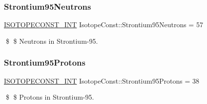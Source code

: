 \subsubsection{\texorpdfstring{Strontium95\+Neutrons}{Strontium95Neutrons}}
{\footnotesize\ttfamily \mbox{\hyperlink{group___isotope_const-_macros_ga5f18360b3e99483a35c32d789e62621c}{I\+S\+O\+T\+O\+P\+E\+C\+O\+N\+S\+T\+\_\+\+I\+NT}} Isotope\+Const\+::\+Strontium95\+Neutrons = 57}

\$ \$ Neutrons in Strontium-\/95. \mbox{\label{group___isotope_const-_strontium-_sr95_ga322a5c15ffe065a1cc477b8da9c54b05}} 
\subsubsection{\texorpdfstring{Strontium95\+Protons}{Strontium95Protons}}
{\footnotesize\ttfamily \mbox{\hyperlink{group___isotope_const-_macros_ga5f18360b3e99483a35c32d789e62621c}{I\+S\+O\+T\+O\+P\+E\+C\+O\+N\+S\+T\+\_\+\+I\+NT}} Isotope\+Const\+::\+Strontium95\+Protons = 38}

\$ \$ Protons in Strontium-\/95. 